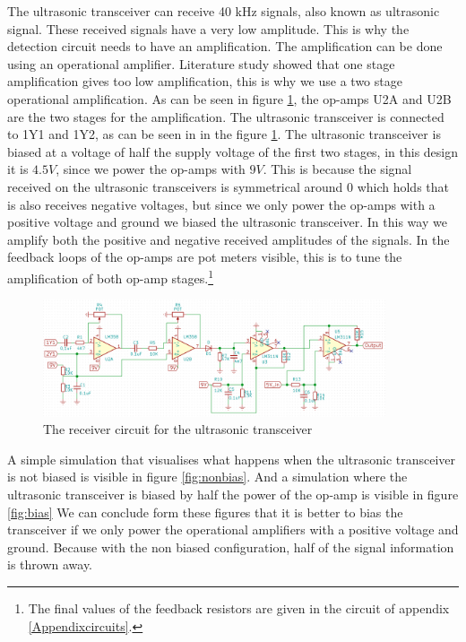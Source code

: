 The ultrasonic transceiver can receive 40 kHz signals, also known as ultrasonic signal. These received signals have a very low amplitude. This is why the detection circuit needs to have an amplification. The amplification can be done using an operational amplifier. Literature study showed that one stage amplification gives too low amplification, this is why we use a two stage operational amplification. As can be seen in figure \ref{fig:receivecircuit}, the op-amps U2A and U2B are the two stages for the amplification.
The ultrasonic transceiver is connected to 1Y1 and 1Y2, as can be seen in in the figure \ref{fig:receivecircuit}. The ultrasonic transceiver is biased at a voltage of half the supply voltage of the first two stages, in this design it is $4.5V$, since we power the op-amps with $9V$. This is because the signal received on the ultrasonic transceivers is symmetrical around 0 which holds that is also receives negative voltages, but since we only power the op-amps with a positive voltage and ground we biased the ultrasonic transceiver. In this way we amplify both the positive and negative received amplitudes of the signals.
In the feedback loops of the op-amps are pot meters visible, this is to tune the amplification of both op-amp stages.\footnote{The final values of the feedback resistors are given in the circuit of appendix \ref{Appendixcircuits}.}

\begin{figure}[H]
\centering
\includegraphics[width=0.9\textwidth]{Figures/receivercircuit.PNG}
\caption{The receiver circuit for the ultrasonic transceiver}
\label{fig:receivecircuit}
\end{figure}

A simple simulation that visualises what happens when the ultrasonic transceiver is not biased is visible in figure \ref{fig:nonbias}.
And a simulation where the ultrasonic transceiver is biased by half the power of the op-amp is visible in figure \ref{fig:bias}
We can conclude form these figures that it is better to bias the transceiver if we only power the operational amplifiers with a positive voltage and ground. Because with the non biased configuration, half of the signal information is thrown away.

